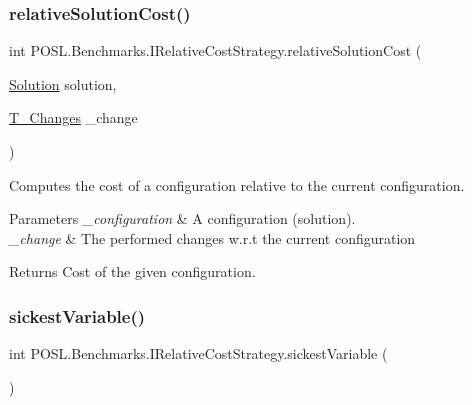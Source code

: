 \subsubsection{\texorpdfstring{relative\+Solution\+Cost()}{relativeSolutionCost()}\hspace{0.1cm}{\footnotesize\ttfamily [2/2]}}
{\footnotesize\ttfamily int P\+O\+S\+L.\+Benchmarks.\+I\+Relative\+Cost\+Strategy.\+relative\+Solution\+Cost (\begin{DoxyParamCaption}\item[{\hyperlink{classPOSL_1_1Data_1_1Solution}{Solution}}]{solution,  }\item[{\hyperlink{structPOSL_1_1Tools_1_1T__Changes}{T\+\_\+\+Changes}}]{\+\_\+change }\end{DoxyParamCaption})}



Computes the cost of a configuration relative to the current configuration. 


\begin{DoxyParams}{Parameters}
{\em \+\_\+configuration} & A configuration (solution). \\
\hline
{\em \+\_\+change} & The performed changes w.\+r.\+t the current configuration \\
\hline
\end{DoxyParams}
\begin{DoxyReturn}{Returns}
Cost of the given configuration. 
\end{DoxyReturn}
\mbox{\label{interfacePOSL_1_1Benchmarks_1_1IRelativeCostStrategy_ae52e1ef62b902b5e87be5f6bcdb64dbc}} 
\subsubsection{\texorpdfstring{sickest\+Variable()}{sickestVariable()}}
{\footnotesize\ttfamily int P\+O\+S\+L.\+Benchmarks.\+I\+Relative\+Cost\+Strategy.\+sickest\+Variable (\begin{DoxyParamCaption}{ }\end{DoxyParamCaption})}



